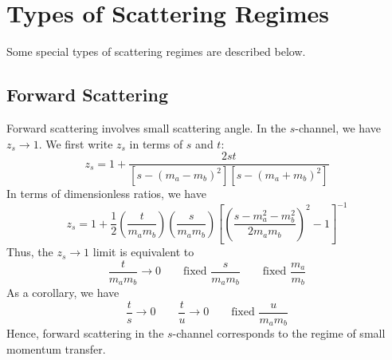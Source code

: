 \section{Types of Scattering Regimes}
Some special types of scattering regimes are described below.
\subsection{Forward Scattering}
Forward scattering involves small scattering angle. In the $s$-channel, we have $z_{s} \rightarrow 1$. We first write $z_{s}$ in terms of $s$ and $t$:
\begin{equation}
	z_{s} = 1 + \frac{2 s t}{[s - (m_{a} - m_{b})^{2}] [s - (m_{a} + m_{b})^{2}]}
\end{equation}
In terms of dimensionless ratios, we have
\begin{equation}
	z_{s} = 1 + \frac{1}{2} \left( \frac{t}{m_{a} m_{b}} \right) \left( \frac{s}{m_{a} m_{b}} \right) \left[ \left( \frac{s - m_{a}^{2} - m_{b}^{2}}{2 m_{a} m_{b}} \right)^{2} - 1 \right]^{-1}
\end{equation}
Thus, the $z_{s} \rightarrow 1$ limit is equivalent to
\begin{equation}
	\frac{t}{m_{a} m_{b}} \rightarrow 0 \qquad \text{fixed } \frac{s}{m_{a} m_{b}} \qquad \text{fixed } \frac{m_{a}}{m_{b}}
\end{equation}
As a corollary, we have
\begin{equation}
	\frac{t}{s} \rightarrow 0 \qquad \frac{t}{u} \rightarrow 0 \qquad \text{fixed } \frac{u}{m_{a} m_{b}}
\end{equation}
Hence, forward scattering in the $s$-channel corresponds to the regime of small momentum transfer.
